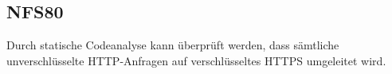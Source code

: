 \subsection*{NFS80}

Durch statische Codeanalyse kann überprüft werden, dass sämtliche unverschlüsselte HTTP-Anfragen auf verschlüsseltes HTTPS umgeleitet wird.